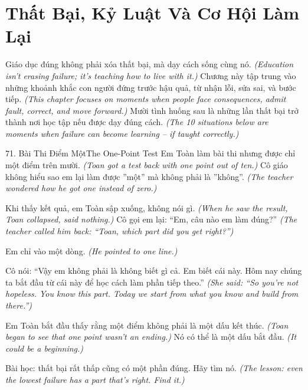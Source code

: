 \chapter{Thất Bại, Kỷ Luật Và Cơ Hội Làm Lại}

\begin{leadbox}
Giáo dục đúng không phải xóa thất bại, mà dạy cách sống cùng nó.
\textit{(Education isn't erasing failure; it's teaching how to live with it.)}
Chương này tập trung vào những khoảnh khắc con người đứng trước hậu quả, từ nhận lỗi, sửa sai, và bước tiếp.
\textit{(This chapter focuses on moments when people face consequences, admit fault, correct, and move forward.)}
Mười tình huống sau là những lần thất bại trở thành nơi học tập nếu được dạy đúng cách.
\textit{(The 10 situations below are moments when failure can become learning -- if taught correctly.)}
\end{leadbox}

\begin{truyen}{71. Bài Thi Điểm Một}{The One-Point Test}
Em Toàn làm bài thi nhưng được chỉ một điểm trên mười.
\textit{(Toan got a test back with one point out of ten.)}
Cô giáo không hiểu sao em lại làm được ''một'' mà không phải là ''không''.
\textit{(The teacher wondered how he got one instead of zero.)}

Khi thấy kết quả, em Toàn sập xuống, không nói gì.
\textit{(When he saw the result, Toan collapsed, said nothing.)}
Cô gọi em lại: ``Em, câu nào em làm đúng?''
\textit{(The teacher called him back: ``Toan, which part did you get right?'')}

Em chỉ vào một dòng.
\textit{(He pointed to one line.)}

Cô nói: ``Vậy em không phải là không biết gì cả. Em biết cái này. Hôm nay chúng ta bắt đầu từ cái này để học cách làm phần tiếp theo.''
\textit{(She said: ``So you're not hopeless. You know this part. Today we start from what you know and build from there.'')}

Em Toàn bắt đầu thấy rằng một điểm không phải là một dấu kết thúc.
\textit{(Toan began to see that one point wasn't an ending.)}
Nó có thể là một dấu bắt đầu.
\textit{(It could be a beginning.)}

Bài học: thất bại rất thấp cũng có một phần đúng. Hãy tìm nó.
\textit{(The lesson: even the lowest failure has a part that's right. Find it.)}
\end{truyen}

